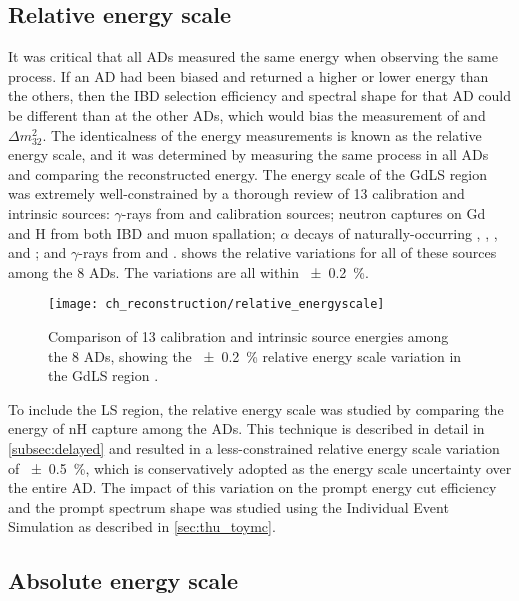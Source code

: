 \subsection{Relative energy scale}
\label{subsec:rel_energyscale}

It was critical that all ADs measured the same energy when observing the same process.
If an AD had been biased and returned a higher or lower energy than the others,
then the IBD selection efficiency and spectral shape for that AD
could be different than at the other ADs,
which would bias the measurement of \thetaot{} and $\Delta m^2_{32}$.
The identicalness of the energy measurements is known as the relative energy scale,
and it was determined by measuring the same process in all ADs and comparing
the reconstructed energy.
The energy scale of the GdLS region was extremely well-constrained
by a thorough review of 13 calibration and intrinsic sources:
$\gamma$-rays from  and  calibration sources;
neutron captures on Gd and H from both IBD and muon spallation;
$\alpha$ decays of naturally-occurring ,
, , and ;
and $\gamma$-rays from  and  \cite{ngd2016}.
 shows the relative variations
for all of these sources among the 8 ADs.
The variations are all within \SI{+-0.2}{\percent}.

\begin{figure}
    \centering
    \texttt{[image: ch\_reconstruction/relative\_energyscale]}
    \caption[Relative energy scale for GdLS volume]{
        Comparison of 13 calibration and intrinsic source energies
        among the 8 ADs, showing the \SI{+-0.2}{\percent}
        relative energy scale variation in the GdLS region
        \cite{ngd2016}.
    }
    \label{fig:gdls_rel_energyscale}
\end{figure}

To include the LS region, the relative energy scale was studied
by comparing the energy of nH capture among the ADs.
This technique is described in detail in \cref{subsec:delayed}
and resulted in a less-constrained relative energy scale variation
of \SI{+-0.5}{\percent}, which is conservatively adopted
as the energy scale uncertainty over the entire AD.
The impact of this variation on the prompt energy cut efficiency
and the prompt spectrum shape
was studied using the Individual Event Simulation
as described in \cref{sec:thu_toymc}.

\subsection{Absolute energy scale}
\label{subsec:abs_energyscale}

